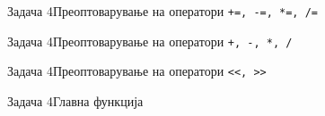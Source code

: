 \begin{frame}[fragile]{Задача 4}{Преоптоварување на оператори
\texttt{+=, -=, *=, /=}}

\end{frame}

\begin{frame}[fragile]{Задача 4}{Преоптоварување на оператори
\texttt{+, -, *, /}}

\end{frame}

\begin{frame}[fragile]{Задача 4}{Преоптоварување на оператори
\texttt{<<, >>}}

\end{frame}

\begin{frame}[fragile]{Задача 4}{Главна функција}

\end{frame}
